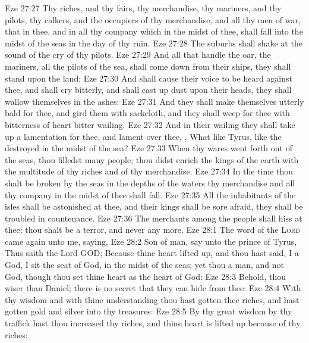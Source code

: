 \vs Eze 27:27 Thy riches, and thy fairs, thy merchandise, thy mariners, and thy pilots, thy calkers, and the occupiers of thy merchandise, and all thy men of war, that  in thee, and in all thy company which  in the midst of thee, shall fall into the midst of the seas in the day of thy ruin.
\vs Eze 27:28 The suburbs shall shake at the sound of the cry of thy pilots.
\vs Eze 27:29 And all that handle the oar, the mariners,  all the pilots of the sea, shall come down from their ships, they shall stand upon the land;
\vs Eze 27:30 And shall cause their voice to be heard against thee, and shall cry bitterly, and shall cast up dust upon their heads, they shall wallow themselves in the ashes:
\vs Eze 27:31 And they shall make themselves utterly bald for thee, and gird them with sackcloth, and they shall weep for thee with bitterness of heart  bitter wailing.
\vs Eze 27:32 And in their wailing they shall take up a lamentation for thee, and lament over thee, , What  like Tyrus, like the destroyed in the midst of the sea?
\vs Eze 27:33 When thy wares went forth out of the seas, thou filledst many people; thou didst enrich the kings of the earth with the multitude of thy riches and of thy merchandise.
\vs Eze 27:34 In the time  thou shalt be broken by the seas in the depths of the waters thy merchandise and all thy company in the midst of thee shall fall.
\vs Eze 27:35 All the inhabitants of the isles shall be astonished at thee, and their kings shall be sore afraid, they shall be troubled in  countenance.
\vs Eze 27:36 The merchants among the people shall hiss at thee; thou shalt be a terror, and never  any more.
\vs Eze 28:1 The word of the \textsc{Lord} came again unto me, saying,
\vs Eze 28:2 Son of man, say unto the prince of Tyrus, Thus saith the Lord GOD; Because thine heart  lifted up, and thou hast said, I  a God, I sit  the seat of God, in the midst of the seas; yet thou  a man, and not God, though thou set thine heart as the heart of God:
\vs Eze 28:3 Behold, thou  wiser than Daniel; there is no secret that they can hide from thee:
\vs Eze 28:4 With thy wisdom and with thine understanding thou hast gotten thee riches, and hast gotten gold and silver into thy treasures:
\vs Eze 28:5 By thy great wisdom  by thy traffick hast thou increased thy riches, and thine heart is lifted up because of thy riches:
